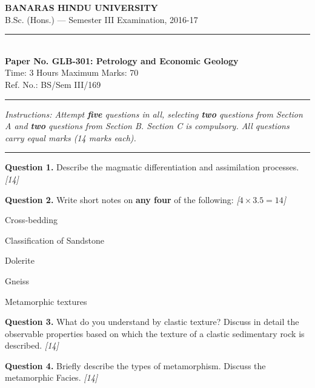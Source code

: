 \documentclass[11pt,a4paper]{article}
\newcommand{\pts}[1]{\hfill   \textit{[#1]}}
\begin{document}
\begin{center}
  {\large\bfseries BANARAS HINDU UNIVERSITY}\\[2pt]
  {\normalsize B.Sc. (Hons.) --- Semester III Examination, 2016-17}\\[6pt]
  \rule{0.8\linewidth}{0.5pt}\\[6pt]
  {\large\bfseries Paper No. GLB-301: Petrology and Economic Geology}\\[4pt]
  {\normalsize Time: 3 Hours \hfill Maximum Marks: 70}\\[2pt]
  {\small Ref. No.: BS/Sem III/169}
\end{center}
\rule{\linewidth}{0.4pt}
\smallskip



\noindent   \textit{Instructions: Attempt   \textbf{five} questions in all, selecting   \textbf{two} questions from Section A and   \textbf{two} questions from Section B. Section C is compulsory. All questions carry equal marks (14 marks each).}
\bigskip

\bigskip


\rule{\linewidth}{0.4pt}\smallskip




\noindent   \textbf{Question 1.} Describe the magmatic differentiation and assimilation processes. \pts{14}

\medskip


\noindent   \textbf{Question 2.} Write short notes on   \textbf{any four} of the following: \pts{$4  \times 3.5 = 14$}

\begin{parts}
  \item Cross-bedding
  \item Classification of Sandstone
  \item Dolerite
  \item Gneiss
  \item Metamorphic textures
\end{parts}

\medskip


\noindent   \textbf{Question 3.} What do you understand by clastic texture? Discuss in detail the observable properties based on which the texture of a clastic sedimentary rock is described. \pts{14}

\medskip


\noindent   \textbf{Question 4.} Briefly describe the types of metamorphism. Discuss the metamorphic Facies. \pts{14}
\end{document}
